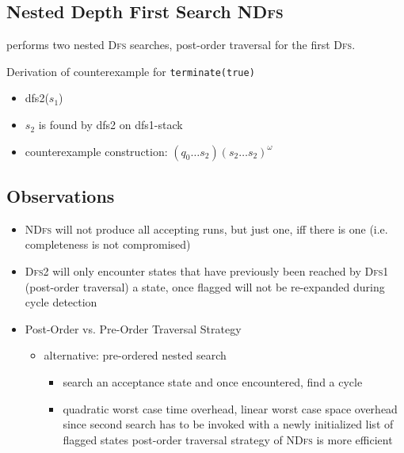 \documentclass[a4paper, 10pt]{article}
\begin{document}
\subsection*{Nested Depth First Search \textsc{NDfs}}
performs two nested \textsc{Dfs} searches, post-order traversal for the first \textsc{Dfs}. \\

\begin{minipage}[]{0.78\textwidth}
Derivation of counterexample for \texttt{terminate(true)}
\begin{itemize}
    \item dfs2($s_1$)
    \item $s_2$ is found by dfs2 on dfs1-stack
    \item counterexample construction: $(q_0\dots s_2)(s_2\dots s_2)^\omega$
\end{itemize}
\end{minipage}
\begin{minipage}[]{0.28\textwidth}
    \begin{center}
    \scalebox{1}{}
    \end{center}
\end{minipage}
\subsection*{Observations}
\begin{itemize}
    \item \textsc{NDfs} will not produce all accepting runs, but just one, iff there is one (i.e. completeness is not compromised)
    \item \textsc{Dfs2} will only encounter states that have previously been reached by \textsc{Dfs1} (post-order traversal) \follows a state, once flagged will not be re-expanded during cycle detection
    \item Post-Order vs. Pre-Order Traversal Strategy
    \begin{itemize}
        \item alternative: pre-ordered nested search
        \begin{itemize}
            \item search an acceptance state and once encountered, find a cycle
            \item quadratic worst case time overhead, linear worst case space overhead \follows since second search has to be invoked with a newly initialized list of flagged states
            \fitem post-order traversal strategy of \textsc{NDfs} is more efficient
        \end{itemize}
    \end{itemize}
\end{itemize}
\end{document}
